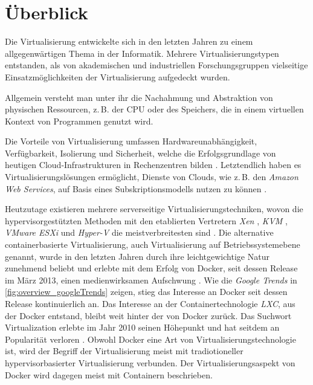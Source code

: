 \documentclass[../main.tex]{subfiles}
\begin{document}
\chapter{Überblick}
\label{overview}
  Die Virtualisierung entwickelte sich in den letzten Jahren zu einem allgegenwärtigen Thema in der Informatik. Mehrere Virtualisierungstypen entstanden, als von akademischen und industriellen Forschungsgruppen vielseitige Einsatzmöglichkeiten der Virtualisierung aufgedeckt wurden.

  Allgemein versteht man unter ihr die Nachahmung und Abstraktion von physischen Ressourcen, z.\,B. der \acrshort{CPU} oder des Speichers, die in einem virtuellen Kontext von Programmen genutzt wird.

  Die Vorteile von Virtualisierung umfassen Hardwareunabhängigkeit, Verfügbarkeit, Isolierung und Sicherheit, welche die Erfolgsgrundlage von heutigen \gls{Cloud}-Infrastrukturen in Rechenzentren bilden \cite[S.1]{containerVirtPerformance}.
  Letztendlich haben es Virtualisierungslösungen ermöglicht, Dienste von Clouds, wie z.\,B. den \emph{Amazon Web Services}\cite{amazonWebServices}, auf Basis eines Subskriptionsmodells nutzen zu können \cite[S.1]{dockerSec1}.

  Heutzutage existieren mehrere serverseitige Virtualisierungstechniken, wovon die hypervisorgestützten Methoden mit den etablierten Vertretern \emph{Xen} \cite{xen}, \emph{KVM} \cite{kvm}, \emph{VMware ESXi} \cite{vmwareESXi} und \emph{Hyper-V} \cite{hyperv} die meistverbreitesten sind \cite[S.2]{containerVirtPerformance}. Die alternative containerbasierte Virtualisierung, auch Virtualisierung auf Betriebssystemebene genannt, wurde in den letzten Jahren durch ihre leichtgewichtige Natur zunehmend beliebt und erlebte mit dem Erfolg von Docker, seit dessen Release im März 2013, einen medienwirksamen Aufschwung \cite{githubDockerChangelog}. Wie die \emph{Google Trends} in \fig \ref{fig:overview_googleTrends} zeigen, stieg das Interesse an Docker seit dessen Release kontinuierlich an. Das Interesse an der Containertechnologie \emph{LXC}, aus der Docker entstand, bleibt weit hinter der von Docker zurück. Das Suchwort \glqq{}Virtualization\grqq{} erlebte im Jahr 2010 seinen Höhepunkt und hat seitdem an Popularität verloren \cite{googleTrends}. Obwohl Docker eine Art von  Virtualisierungstechnologie ist, wird der Begriff der Virtualisierung meist mit tradiotioneller hypervisorbasierter Virtualisierung verbunden. Der Virtualisierungsaspekt von Docker wird dagegen meist mit Containern beschrieben.
\end{document}
